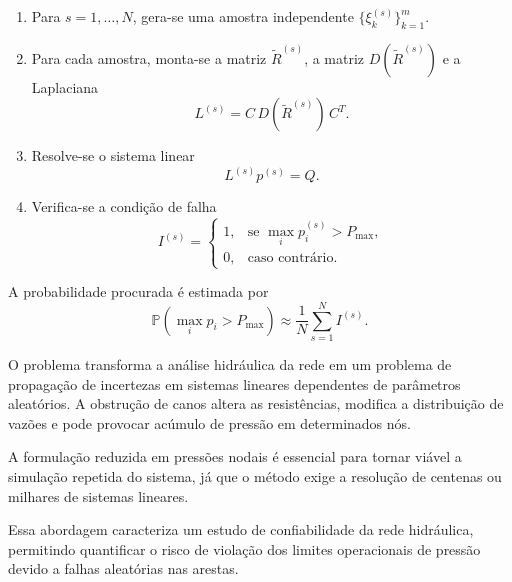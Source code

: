 \documentclass{article}
\begin{document}
\begin{enumerate}
\item Para \(s = 1, \dots, N\), gera-se uma amostra independente
\(\{\xi_k^{(s)}\}_{k=1}^m\).

\item Para cada amostra, monta-se a matriz
\(\widetilde{R}^{(s)}\), a matriz
\(D(\widetilde{R}^{(s)})\) e a Laplaciana
\[
L^{(s)} = C\, D(\widetilde{R}^{(s)})\, C^T.
\]

\item Resolve-se o sistema linear
\[
L^{(s)} p^{(s)} = Q.
\]

\item Verifica-se a condição de falha
\[
I^{(s)} =
\begin{cases}
1, & \text{se } \max_i p_i^{(s)} > P_{\max}, \\
0, & \text{caso contrário.}
\end{cases}
\]
\end{enumerate}

A probabilidade procurada é estimada por
\[
\mathbb{P}\!\left(\max_i p_i > P_{\max}\right)
\approx
\frac{1}{N} \sum_{s=1}^{N} I^{(s)}.
\]

O problema transforma a análise hidráulica da rede em um problema
de propagação de incertezas em sistemas lineares dependentes de parâmetros
aleatórios. A obstrução de canos altera as resistências, modifica a
distribuição de vazões e pode provocar acúmulo de pressão em determinados nós.

A formulação reduzida em pressões nodais é essencial para tornar viável
a simulação repetida do sistema, já que o método exige a resolução de
centenas ou milhares de sistemas lineares.

Essa abordagem caracteriza um estudo de confiabilidade da rede hidráulica,
permitindo quantificar o risco de violação dos limites operacionais
de pressão devido a falhas aleatórias nas arestas.













\end{document}
